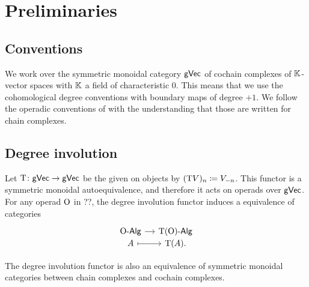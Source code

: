 
\section{Preliminaries}

\subsection{Conventions}

We work over the symmetric monoidal category $\mathsf{gVec}$ of cochain complexes of \(\mathbb{K}\)-vector spaces with \(\mathbb{K}\) a field of characteristic \(0\).
This means that we use the cohomological degree conventions with boundary maps of degree $+1$. 
We follow the operadic conventions of \cite{LodayVallette12} with the understanding that those are written for chain complexes.

\subsection{Degree involution}

Let \(\mathrm{T}\colon \mathsf{gVec} \to \mathsf{gVec}\) be the  given on objects by \((\mathrm{T} V)_n \coloneqq V_{-n}\).
This functor is a symmetric monoidal autoequivalence, and therefore it acts on operads over \(\mathsf{gVec}\).
For any operad \(\mathrm{O}\) in ??, the degree involution functor induces a equivalence of categories
\[
\begin{tikzcd}[column sep=small, row sep=-3pt]
	\rO\text{-}\mathsf{Alg}
	\arrow[r] & \rT(\rO)\text{-}\mathsf{Alg} \\
	A \arrow[r, maps to] & \rT(A).
\end{tikzcd}
\]

The degree involution functor is also an equivalence of symmetric monoidal categories between chain complexes and cochain complexes.